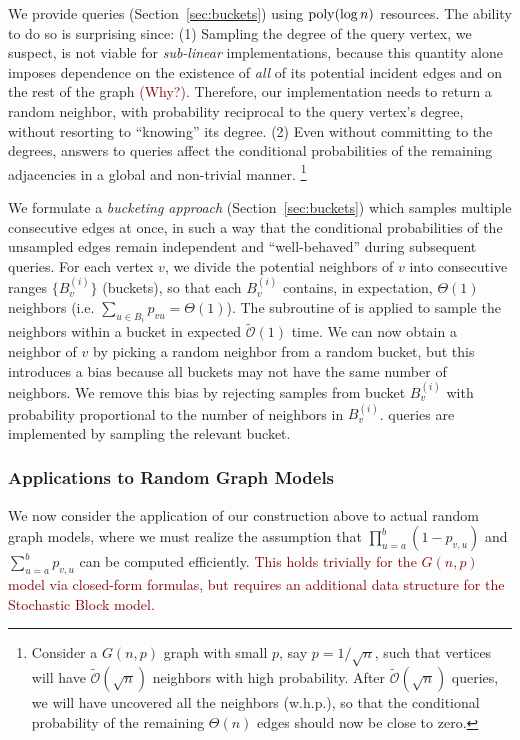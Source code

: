 We provide  queries (Section~\ref{sec:buckets}) using $\mathrm{poly}(\log n)$ resources.
The ability to do so is surprising since:
(1) Sampling the degree of the query vertex, we suspect, is not viable for \emph{sub-linear} implementations, because this quantity alone
imposes dependence on the existence of \emph{all} of its potential incident edges and on the rest of the graph \textcolor{Maroon}{(Why?)}.
Therefore, our implementation needs to return a random neighbor, with probability reciprocal to the query vertex's degree,
without resorting to ``knowing'' its degree.
(2) Even without committing to the degrees, answers to  queries
affect the conditional probabilities of the remaining adjacencies in a global and non-trivial manner.
\footnote{\label{conditional}Consider a $G(n,p)$ graph with small $p$, say $p = 1/\sqrt n$,
such that vertices will have $\tilde{\mathcal{O}}(\sqrt n)$ neighbors with high probability.
After $\tilde{\mathcal{O}}(\sqrt n)$  queries, we will have uncovered all the neighbors (w.h.p.),
so that the conditional probability of the remaining $\Theta(n)$ edges should now be close to zero.}

We formulate a \emph{bucketing approach} (Section~\ref{sec:buckets}) which samples multiple consecutive edges at once,
in such a way that the conditional probabilities of the unsampled edges remain independent and ``well-behaved'' during subsequent queries.
For each vertex $v$, we divide the potential neighbors of $v$ into consecutive ranges $\{B^{(i)}_v\}$ (buckets),
so that each $B^{(i)}_v$ contains, in expectation, $\Theta(1)$ neighbors (i.e. $\sum_{u\in B_i} p_{vu} = \Theta(1)$).
The subroutine of  is applied to sample the neighbors within a bucket in expected $\mathcal{\tilde O}(1)$ time.
We can now obtain a neighbor of $v$ by picking a random neighbor from a random bucket,
but this introduces a bias because all buckets may not have the same number of neighbors.
We remove this bias by rejecting samples from bucket $B^{(i)}_v$ with probability proportional to the number of neighbors in $B^{(i)}_v$.
 queries are implemented by sampling the relevant bucket.




\subsubsection{Applications to Random Graph Models}
\label{sec:applications_to_random_graph_models}
We now consider the application of our construction above to actual random graph models,
where we must realize the assumption that $\prod^{b}_{u=a} (1-p_{v,u})$ and $\sum^{b}_{u=a} p_{v,u}$ can be computed efficiently.
\textcolor{Maroon}
{This holds trivially for the $G(n,p)$ model via closed-form formulas, but requires an additional data structure for the Stochastic Block model.}


